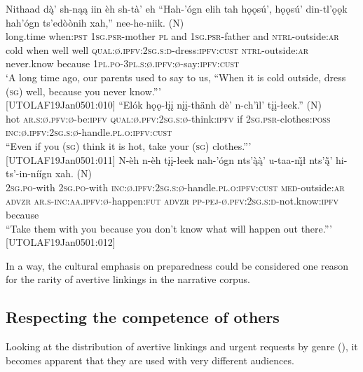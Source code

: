 \documentclass[output=paper,colorlinks,citecolor=brown]{langscibook}
\begin{document}
\begin{exe}
\ex \label{in-case3}
\begin{xlista}
\ex 
\gll Nithaad dą̀' sh-nąą iin èh sh-tà' eh ``Hah-'ógn elih tah hǫǫsú', hǫǫsú' din-tl'ǫǫk hah'ógn ts'edòònih xah,'' {nee-he-niik. \textnormal{(N)}}\\
long.time when:\textsc{pst} \textsc{1sg.psr}-mother \textsc{pl} and \textsc{1sg.psr}-father and \textsc{ntrl}-outside:\textsc{ar} cold when well well \textsc{qual:ø.ipfv:2sg.s:d}-dress:\textsc{ipfv:cust} \textsc{ntrl}-outside:\textsc{ar} never.know because \textsc{1pl.po-3pl.s:ø.ipfv:ø}-say:\textsc{ipfv:cust} \\
\glt `A long time ago, our parents used to say to us, ``When it is cold outside, dress (\textsc{sg}) well, because you never know.''' \\ \hfill [UTOLAF19Jan0501:010]
\ex 
\gll ``Elók hǫǫ-łįį nįį-thänh dè' n-ch'ìl' {tįį-łeek.'' \textnormal{(N)}}\\
hot \textsc{ar.s:ø.pfv:ø}-be:\textsc{ipfv} \textsc{qual:ø.pfv:2sg.s:ø}-think:\textsc{ipfv} if \textsc{2sg.psr}-clothes:\textsc{poss} \textsc{inc:ø.ipfv:2sg.s:ø}-handle.\textsc{pl.o:ipfv:cust} \\
``Even if you (\textsc{sg}) think it is hot, take your (\textsc{sg}) clothes.''' \\ \hfill [UTOLAF19Jan0501:011]
\ex 
\gll N-èh n-èh tįį-łeek nah-'ógn nts'ą̀ą̀' u-taa-nį̀ł nts'ą̈̀' hi-ts'-in-níígn {xah. \textnormal{(N)}} \\
\textsc{2sg.po}-with \textsc{2sg.po}-with \textsc{inc:ø.ipfv:2sg.s:ø}-handle.\textsc{pl.o:ipfv:cust} \textsc{med}-outside:\textsc{ar} \textsc{advzr} \textsc{ar.s-inc:aa.ipfv:ø}-happen:\textsc{fut} \textsc{advzr} \textsc{pp-pej-ø.pfv:2sg.s:d}-not.know:\textsc{ipfv} because \\
``Take them with you because you don't know what will happen out there.''' \hfill [UTOLAF19Jan0501:012]
\end{xlista}
\end{exe}

In a way, the cultural emphasis on preparedness could be considered one reason for the rarity of avertive linkings in the narrative corpus. 

\subsection{Respecting the competence of others}
\label{subsection:other-avertive}

Looking at the distribution of avertive linkings and urgent requests by genre (), it becomes apparent that they are used with very different audiences.
\end{document}
